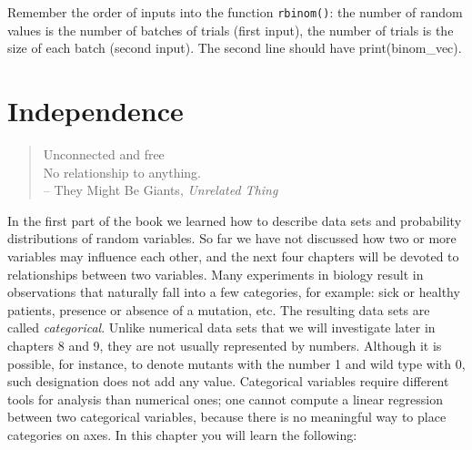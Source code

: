 \documentclass[
  letterpaper,
  DIV=11,
  numbers=noendperiod]{scrreprt}
\begin{document}
\begin{tcolorbox}[enhanced jigsaw, arc=.35mm, colframe=quarto-callout-caution-color-frame, left=2mm, opacitybacktitle=0.6, breakable, title=\textcolor{quarto-callout-caution-color}{\faFire}\hspace{0.5em}{Hint}, toprule=.15mm, coltitle=black, bottomtitle=1mm, toptitle=1mm, colback=white, leftrule=.75mm, colbacktitle=quarto-callout-caution-color!10!white, titlerule=0mm, opacityback=0, rightrule=.15mm, bottomrule=.15mm]

Remember the order of inputs into the function \texttt{rbinom()}: the
number of random values is the number of batches of trials (first
input), the number of trials is the size of each batch (second input).
The second line should have print(binom\_vec).

\end{tcolorbox}


\hypertarget{independence}{%
\chapter{Independence}\label{independence}}

\begin{quote}
Unconnected and free\\
No relationship to anything.\\
-- They Might Be Giants, \emph{Unrelated Thing}
\end{quote}

In the first part of the book we learned how to describe data sets and
probability distributions of random variables. So far we have not
discussed how two or more variables may influence each other, and the
next four chapters will be devoted to relationships between two
variables. Many experiments in biology result in observations that
naturally fall into a few categories, for example: sick or healthy
patients, presence or absence of a mutation, etc. The resulting data
sets are called \emph{categorical}. Unlike numerical data sets that we
will investigate later in chapters 8 and 9, they are not usually
represented by numbers. Although it is possible, for instance, to denote
mutants with the number 1 and wild type with 0, such designation does
not add any value. Categorical variables require different tools for
analysis than numerical ones; one cannot compute a linear regression
between two categorical variables, because there is no meaningful way to
place categories on axes. In this chapter you will learn the following:
\end{document}
